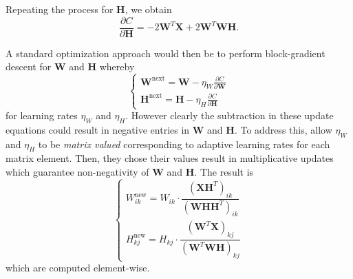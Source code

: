 Repeating the process for $\mathbf{H}$, we obtain
\begin{equation}
  \frac{\partial C}{\partial \mathbf{H}} = -2\mathbf{W}^T\mathbf{X} + 2\mathbf{W}^T\mathbf{W}\mathbf{H}.
\end{equation}

A standard optimization approach would then be to perform block-gradient descent
for $\mathbf{W}$ and $\mathbf{H}$ whereby
\begin{equation}
  \begin{cases}
    \mathbf{W}^{\text{next}} = \mathbf{W} - \eta_{W}\frac{\partial C}{\partial \mathbf{W}} \\
    \mathbf{H}^{\text{next}} = \mathbf{H} - \eta_{H}\frac{\partial C}{\partial \mathbf{H}}
  \end{cases}
\end{equation}
for learning rates $\eta_{W}$ and $\eta_{H}$. However clearly the subtraction in
these update equations could result in negative entries in $\mathbf{W}$ and
$\mathbf{H}$. To address this, \cite{nmf-orig} allow $\eta_{W}$ and $\eta_{H}$
to be \textit{matrix valued} corresponding to adaptive learning rates for each
matrix element. Then, they chose their values result in multiplicative updates
which guarantee non-negativity of $\mathbf{W}$ and $\mathbf{H}$. The result is
\begin{equation}
  \begin{cases}
    W^{\text{new}}_{ik} = W_{ik} \cdot    \dfrac{(\mathbf{X}\mathbf{H}^T)_{ik}}{(\mathbf{W}\mathbf{H}\mathbf{H}^T)_{ik}} \\
    H^{\text{new}}_{kj} = H_{kj} \cdot \dfrac{(\mathbf{W}^T\mathbf{X})_{kj}}{(\mathbf{W}^T\mathbf{W}\mathbf{H})_{kj}}
  \end{cases}
\end{equation}
which are computed element-wise.

